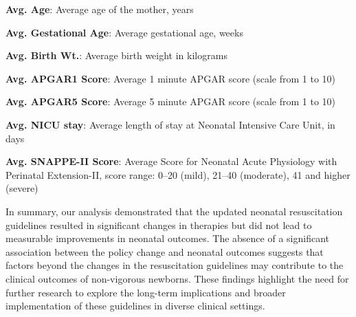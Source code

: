 \documentclass[11pt]{article}
\begin{document}
\begin{table}[h]
\caption{Summary of key variables before and after new policy}
\label{table:SummaryVariables}
\begin{threeparttable}
\renewcommand{\TPTminimum}{\linewidth}
\begin{tablenotes}
\footnotesize
\item \textbf{Avg. Age}: Average age of the mother, years
\item \textbf{Avg. Gestational Age}: Average gestational age, weeks
\item \textbf{Avg. Birth Wt.}: Average birth weight in kilograms
\item \textbf{Avg. APGAR1 Score}: Average 1 minute APGAR score (scale from 1 to 10)
\item \textbf{Avg. APGAR5 Score}: Average 5 minute APGAR score (scale from 1 to 10)
\item \textbf{Avg. NICU stay}: Average length of stay at Neonatal Intensive Care Unit, in days
\item \textbf{Avg. SNAPPE-II Score}: Average Score for Neonatal Acute Physiology with Perinatal Extension-II, score range: 0–20 (mild), 21–40 (moderate), 41 and higher (severe)
\end{tablenotes}
\end{threeparttable}
\end{table}


In summary, our analysis demonstrated that the updated neonatal resuscitation guidelines resulted in significant changes in therapies but did not lead to measurable improvements in neonatal outcomes. The absence of a significant association between the policy change and neonatal outcomes suggests that factors beyond the changes in the resuscitation guidelines may contribute to the clinical outcomes of non-vigorous newborns. These findings highlight the need for further research to explore the long-term implications and broader implementation of these guidelines in diverse clinical settings.
\end{document}
